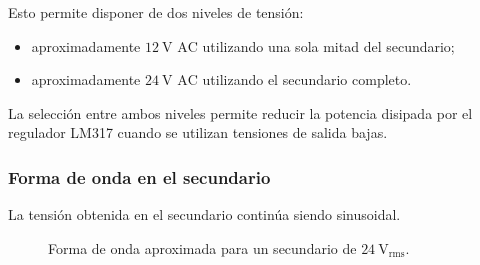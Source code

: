 \documentclass[12pt,a4paper]{article}
\begin{document}
	Esto permite disponer de dos niveles de tensión:
	
	\begin{itemize}
		
		\item aproximadamente $12~\text{V AC}$ utilizando una sola mitad del
		secundario;
		
		\item aproximadamente $24~\text{V AC}$ utilizando el secundario completo.
		
	\end{itemize}
	
	La selección entre ambos niveles permite reducir la potencia disipada por el
	regulador LM317 cuando se utilizan tensiones de salida bajas.
	
	\subsubsection{Forma de onda en el secundario}
	
	La tensión obtenida en el secundario continúa siendo sinusoidal.
	
	\begin{figure}[H]
		\centering
		
		
		\caption{Forma de onda aproximada para un secundario de
			$24~\text{V}_{\mathrm{rms}}$.}
		\label{fig:tension_secundario}
		
	\end{figure}
	
\end{document}
